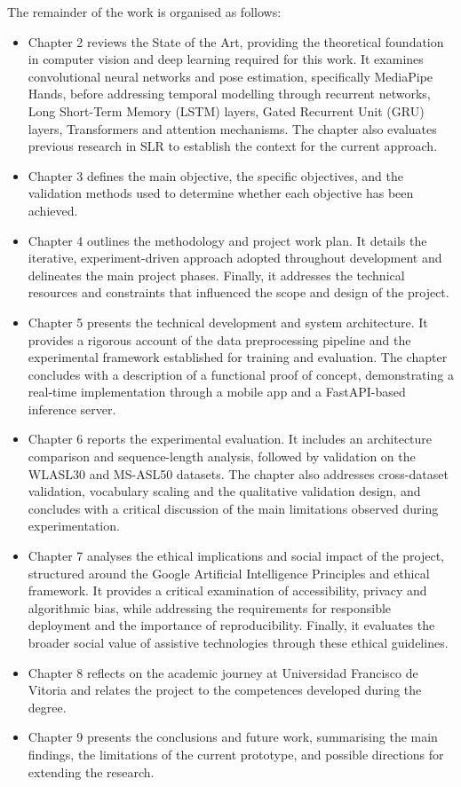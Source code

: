 The remainder of the work is organised as follows:
\begin{itemize}
    \item Chapter 2 reviews the State of the Art, providing the theoretical foundation in computer
          vision and deep learning required for this work. It examines convolutional neural
          networks and pose estimation, specifically MediaPipe Hands, before addressing temporal
          modelling through recurrent networks, Long Short-Term Memory (LSTM) layers, Gated
          Recurrent Unit (GRU) layers, Transformers and attention mechanisms. The chapter also
          evaluates previous research in SLR to establish the context for the current approach.
    \item Chapter 3 defines the main objective, the specific objectives, and the validation methods
          used to determine whether each objective has been achieved.
    \item Chapter 4 outlines the methodology and project work plan. It details the iterative,
          experiment-driven approach adopted throughout development and delineates the main project
          phases. Finally, it addresses the technical resources and constraints that influenced the
          scope and design of the project.
    \item Chapter 5 presents the technical development and system architecture. It provides a
          rigorous account of the data preprocessing pipeline and the experimental framework
          established for training and evaluation. The chapter concludes with a description of a
          functional proof of concept, demonstrating a real-time implementation through a mobile
          app and a FastAPI-based inference server.
    \item Chapter 6 reports the experimental evaluation. It includes an architecture comparison and
          sequence-length analysis, followed by validation on the WLASL30 and MS-ASL50 datasets.
          The chapter also addresses cross-dataset validation, vocabulary scaling and the
          qualitative validation design, and concludes with a critical discussion of the main
          limitations observed during experimentation.
    \item Chapter 7 analyses the ethical implications and social impact of the project, structured
          around the Google Artificial Intelligence Principles and ethical framework. It provides a
          critical examination of accessibility, privacy and algorithmic bias, while addressing the
          requirements for responsible deployment and the importance of reproducibility. Finally,
          it evaluates the broader social value of assistive technologies through these ethical
          guidelines.
    \item Chapter 8 reflects on the academic journey at Universidad Francisco de Vitoria and
          relates the project to the competences developed during the degree.
    \item Chapter 9 presents the conclusions and future work, summarising the main findings, the
          limitations of the current prototype, and possible directions for extending the research.
\end{itemize}